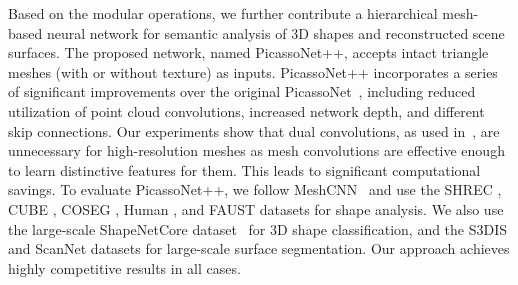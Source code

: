 {\color{black}Based on the modular operations, we further contribute a hierarchical mesh-based neural network for semantic analysis of 3D shapes and reconstructed scene surfaces. The proposed network, named PicassoNet++, accepts intact triangle meshes (with or without texture) as inputs.  
PicassoNet++ incorporates a series of significant improvements over the original PicassoNet~\cite{lei2021picasso}, including reduced utilization of point cloud convolutions, increased network depth, and different skip connections.} Our experiments show that dual convolutions, as used in~\cite{lei2020spherical}, are unnecessary for high-resolution meshes as mesh convolutions are effective enough to learn distinctive features for them. This leads to significant computational savings.
To evaluate PicassoNet++, we follow MeshCNN~\cite{hanocka2019meshcnn} and use the SHREC \cite{lian2011shape}, CUBE \cite{hanocka2019meshcnn}, COSEG \cite{wang2012active}, Human \cite{maron2017convolutional}, and FAUST \cite{bogo2014faust} datasets for shape analysis. We also use the large-scale ShapeNetCore dataset~\cite{chang2015shapenet} for 3D shape classification, and the S3DIS \cite{armeni20163d} and ScanNet \cite{dai2017scannet} datasets for large-scale surface segmentation. Our approach achieves highly competitive results in all cases.

